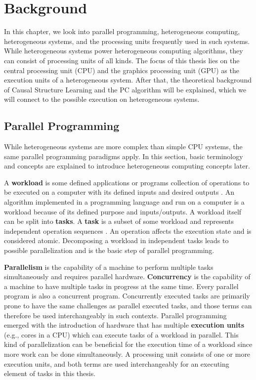 \chapter{Background}
\label{chap:background}
In this chapter, we look into parallel programming, heterogeneous computing, heterogeneous systems, and the processing units frequently used in such systems. While heterogeneous systems power heterogeneous computing algorithms, they can consist of processing units of all kinds. The focus of this thesis lies on the central processing unit (CPU) and the graphics processing unit (GPU) as the execution units of a heterogeneous system.
After that, the theoretical background of Causal Structure Learning and the PC algorithm will be explained, which we will connect to the possible execution on heterogeneous systems.

\section{Parallel Programming}
While heterogeneous systems are more complex than simple CPU systems, the same parallel programming paradigms apply. In this section, basic terminology and concepts are explained to introduce heterogeneous computing concepts later.

A \textbf{workload} is some defined applications or programs collection of operations to be executed on a computer with its defined inputs and desired outputs \cite{pfister1998search}. An algorithm implemented in a programming language and run on a computer is a workload because of its defined purpose and inputs/outputs. A workload itself can be split into \textbf{tasks}. A \textbf{task} is a subset of some workload and represents independent operation sequences \cite{breshearsArtConcurrencyThread2009}. An operation affects the execution state and is considered atomic. Decomposing a workload in independent tasks leads to possible parallelization and is the basic step of parallel programming.

\textbf{Parallelism} is the capability of a machine to perform multiple tasks simultaneously and requires parallel hardware. \textbf{Concurrency} is the capability of a machine to have multiple tasks in progress at the same time. Every parallel program is also a concurrent program. Concurrently executed tasks are primarily prone to have the same challenges as parallel executed tasks, and those terms can therefore be used interchangeably in such contexts. Parallel programming emerged with the introduction of hardware that has multiple \textbf{execution units} (e.g., cores in a CPU) \cite{mattsonPatternsParallelProgramming2004} which can execute tasks of a workload in parallel. This kind of parallelization can be beneficial for the execution time of a workload since more work can be done simultaneously. A processing unit consists of one or more execution units, and both terms are used interchangeably for an executing element of tasks in this thesis.

